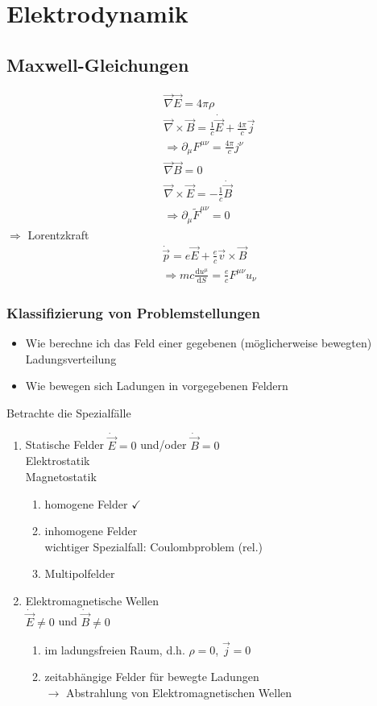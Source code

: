 \documentclass[a4paper]{article}
\begin{document}
\section{Elektrodynamik}
\subsection{Maxwell-Gleichungen}
\begin{align}
\vec{\nabla}\vec{E}=4\pi\rho\\
\vec{\nabla}\times\vec{B}=\frac{1}{c}\dot{\vec{E}}+\frac{4\pi}{c}\vec{j}\\
\Rightarrow \partial_\mu F^{\mu\nu}=\frac{4\pi}{c}j^\nu\\
\vec{\nabla}\vec{B}=0\\
\vec{\nabla}\times\vec{E}=-\frac{1}{c}\dot{\vec{B}}\\
\Rightarrow \partial_\mu \tilde{F}^{\mu\nu}=0
\end{align}
$\Rightarrow$ Lorentzkraft
\begin{align}
\dot{\vec{p}}=e\vec{E}+\frac{e}{c}\vec{v}\times\vec{B}\\
\Rightarrow mc\frac{\mathrm{d}u^\mu}{\mathrm{d}S}=\frac{e}{c}F^{\mu\nu}u_\nu
\end{align}
\subsubsection{Klassifizierung von Problemstellungen}
\begin{itemize}
  \item Wie berechne ich das Feld einer gegebenen (möglicherweise bewegten)
  Ladungsverteilung
  \item Wie bewegen sich Ladungen in vorgegebenen Feldern
\end{itemize}
Betrachte die Spezialfälle
\begin{enumerate}
  \item Statische Felder $\dot{\vec{E}}=0$ und/oder $\dot{\vec{B}}=0$\\
  Elektrostatik \\ Magnetostatik
\begin{enumerate}
  \item homogene Felder $\checkmark$
  \item inhomogene Felder \\ wichtiger Spezialfall: Coulombproblem (rel.)
  \item Multipolfelder 
\end{enumerate}
  \item Elektromagnetische Wellen \\ $\dot{\vec{E}}\neq0$ und
  $\dot{\vec{B}}\neq0$
  \begin{enumerate}
  \item im ladungsfreien Raum, d.h. $\rho=0$, $\vec{j}=0$
  \item zeitabhängige Felder für bewegte Ladungen \\ $\rightarrow$ Abstrahlung
  von Elektromagnetischen Wellen
\end{enumerate}
\end{enumerate}
\end{document}
